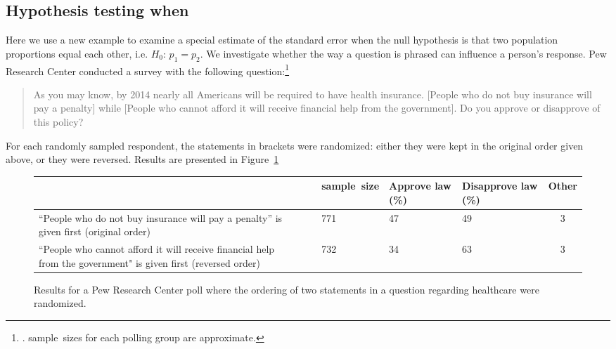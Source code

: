 \subsection[Hypothesis testing when $H_0$: $p_1 = p_2$]{Hypothesis testing when }
\label{pooledHTForProportionsSection}

Here we use a new example to examine a special estimate of the standard error when the null hypothesis is that two population proportions equal each other, i.e. $H_0$: $p_1 = p_2$. We investigate 
whether the way a question is phrased can influence a person's response. Pew Research Center conducted a survey with the following question:\footnote{. sample~sizes for each polling group are approximate.}
\begin{quote}
As you may know, by 2014 nearly all Americans will be required to have health insurance. [People who do not buy insurance will pay a penalty] while [People who cannot afford it will receive financial help from the government]. Do you approve or disapprove of this policy?
\end{quote}
For each randomly sampled respondent, the statements in brackets were randomized: either they were kept in the original order given above, or they were reversed. Results are presented in Figure~\ref{pewPollResultsForRandomizedStatementOrdering}


\begin{figure}[t]
\centering
\begin{tabular}{p{50mm}c p{13mm}p{14mm}p{16.5mm}c}
	&\ & sample~size & Approve law (\%)	& Disapprove law (\%)	& Other \\
\hline
``People who do not buy insurance will pay a penalty'' is given first (original order) \vspace{2.5mm}
	& & 771	& 47	& 49	& 3 \\
``People who cannot afford it will receive financial help from the government" is given first (reversed order) 
	& & 732	& 34	& 63	& 3 \\
\hline
\end{tabular}
\caption{Results for a Pew Research Center poll where the ordering of two statements in a question regarding healthcare were randomized.}
\label{pewPollResultsForRandomizedStatementOrdering}
\end{figure}



